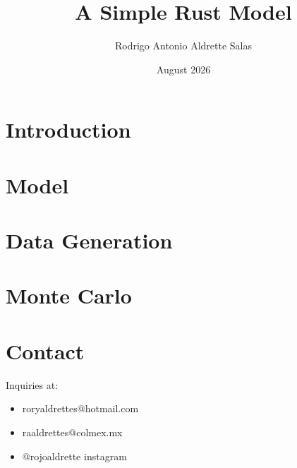 \documentclass{article}
\title{A Simple Rust Model}
\author{Rodrigo Antonio Aldrette Salas}
\date{August 2026}
\begin{document}
\maketitle

\section{Introduction}

\section{Model}

\section{Data Generation}

\section{Monte Carlo}



\section{Contact}
Inquiries at:
\begin{itemize}
    \item roryaldrettes@hotmail.com
    \item raaldrettes@colmex.mx
    \item @rojoaldrette instagram
\end{itemize}
\end{document}
